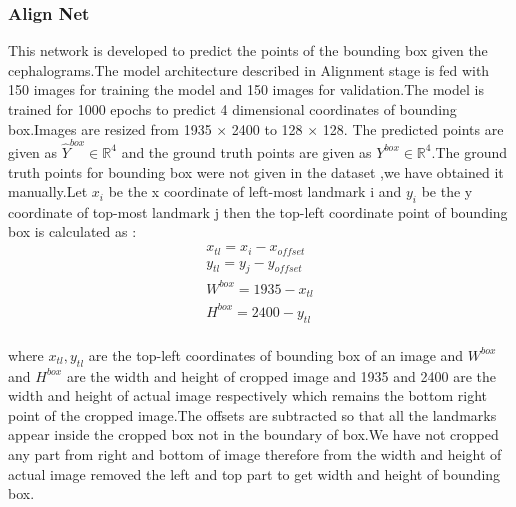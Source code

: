 \documentclass[sn-mathphys]{sn-jnl}%
\theoremstyle{thmstyleone}%
\theoremstyle{thmstyletwo}%
\theoremstyle{thmstylethree}%
\begin{document}
 \subsubsection{Align Net}
This network is developed to predict the points of the bounding box given the cephalograms.The model architecture described in Alignment stage is fed with 150 images for training the model and 150 images for validation.The model is trained for 1000 epochs to predict 4 dimensional coordinates of bounding box.Images are resized from 1935 × 2400 to 128 × 128. The predicted points are given as \begin{math} \hat{Y}^{box} \in \mathbb{R}^{4} \end{math} and the ground truth points are given as \begin{math} Y^{box} \in \mathbb{R}^{4} \end{math}.The ground truth points for bounding box were not given in the dataset ,we have obtained it manually.Let \begin{math} x_{i} \end{math} be the x coordinate of left-most landmark i and \begin{math} y_{i} \end{math} be the y coordinate of top-most landmark j then the top-left coordinate point of bounding box is calculated as :\\

\begin{align*}
    x_{tl} = x_{i} - x_{offset}  \\
    y_{tl} = y_{j} - y_{offset}  \\
   W^{box} = 1935 - x_{tl}  \\
   H^{box} = 2400 - y_{tl}  \\
\end{align*}

where  \begin{math}x_{tl},y_{tl} \end{math} are the top-left coordinates of bounding box of an image and \begin{math}W^{box}\end{math} and \begin{math} H^{box} \end{math} are  the width and height of cropped image and  1935 and 2400 are the width and height of actual image respectively which remains the bottom right point of the cropped image.The offsets are subtracted so that all the landmarks appear inside the cropped box not in the boundary of box.We have not cropped any part from right  and bottom of image therefore from the width and height of actual image removed the left and top part to get width and height of bounding box.
\end{document}
